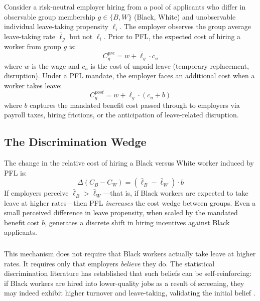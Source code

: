 \documentclass[12pt]{article}
\begin{document}
Consider a risk-neutral employer hiring from a pool of applicants who differ in observable group membership $g \in \{B, W\}$ (Black, White) and unobservable individual leave-taking propensity $\ell_i$. The employer observes the group average leave-taking rate $\bar{\ell}_g$ but not $\ell_i$. Prior to PFL, the expected cost of hiring a worker from group $g$ is:
\begin{equation}
    C_g^{pre} = w + \bar{\ell}_g \cdot c_u
\end{equation}
where $w$ is the wage and $c_u$ is the cost of unpaid leave (temporary replacement, disruption). Under a PFL mandate, the employer faces an additional cost when a worker takes leave:
\begin{equation}
    C_g^{post} = w + \bar{\ell}_g \cdot (c_u + b)
\end{equation}
where $b$ captures the mandated benefit cost passed through to employers via payroll taxes, hiring frictions, or the anticipation of leave-related disruption.

\subsection{The Discrimination Wedge}

The change in the relative cost of hiring a Black versus White worker induced by PFL is:
\begin{equation}
    \Delta(C_B - C_W) = (\bar{\ell}_B - \bar{\ell}_W) \cdot b
\end{equation}
If employers perceive $\bar{\ell}_B > \bar{\ell}_W$---that is, if Black workers are expected to take leave at higher rates---then PFL \textit{increases} the cost wedge between groups. Even a small perceived difference in leave propensity, when scaled by the mandated benefit cost $b$, generates a discrete shift in hiring incentives against Black applicants.

\subsubsection*{}
This mechanism does not require that Black workers actually take leave at higher rates. It requires only that employers \textit{believe} they do. The statistical discrimination literature has established that such beliefs can be self-reinforcing: if Black workers are hired into lower-quality jobs as a result of screening, they may indeed exhibit higher turnover and leave-taking, validating the initial belief \citep{arrow1973, altonji1999}.
\end{document}
